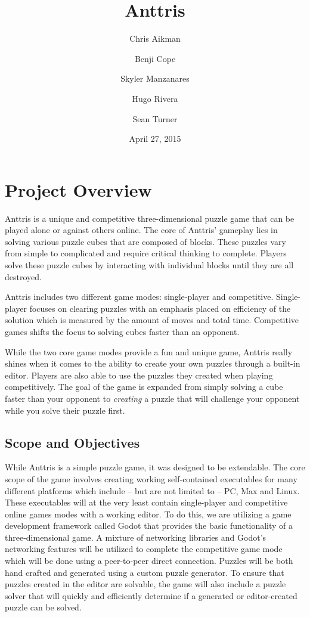 \documentclass[12pt]{article}
\begin{document}
\sf %
\title{Anttris}
\author{%
\and Chris Aikman
\and Benji Cope
\and Skyler Manzanares
\and Hugo Rivera
\and Sean Turner}
\date{April 27, 2015}
\maketitle

\section{Project Overview} %
Anttris is a unique and competitive three-dimensional puzzle game that can be played alone or against others online. The core of Anttris' gameplay lies in solving various puzzle cubes that are composed of blocks. These puzzles vary from simple to complicated and require critical thinking to complete. Players solve these puzzle cubes by interacting with individual blocks until they are all destroyed.

Anttris includes two different game modes: single-player and competitive. Single-player focuses on clearing puzzles with an emphasis placed on efficiency of the solution which is measured by the amount of moves and total time. Competitive games shifts the focus to solving cubes faster than an opponent.

While the two core game modes provide a fun and unique game, Anttris really shines when it comes to the ability to create your own puzzles through a built-in editor. Players are also able to use the puzzles they created when playing competitively. The goal of the game is expanded from simply solving a cube faster than your opponent to \textsl{creating} a puzzle that will challenge your opponent while you solve their puzzle first.
\subsection{Scope and Objectives} %
While Anttris is a simple puzzle game, it was designed to be extendable. The core scope of the game involves creating working self-contained executables for many different platforms which include -- but are not limited to -- PC, Max and Linux. These executables will at the very least contain single-player and competitive online games modes with a working editor. To do this, we are utilizing a game development framework called Godot \cite{godot:gameengine} that provides the basic functionality of a three-dimensional game. A mixture of networking libraries and Godot's networking features will be utilized to complete the competitive game mode which will be done using a peer-to-peer direct connection. Puzzles will be both hand crafted and generated using a custom puzzle generator. To ensure that puzzles created in the editor are solvable, the game will also include a puzzle solver that will quickly and efficiently determine if a generated or editor-created puzzle can be solved.
\end{document}
